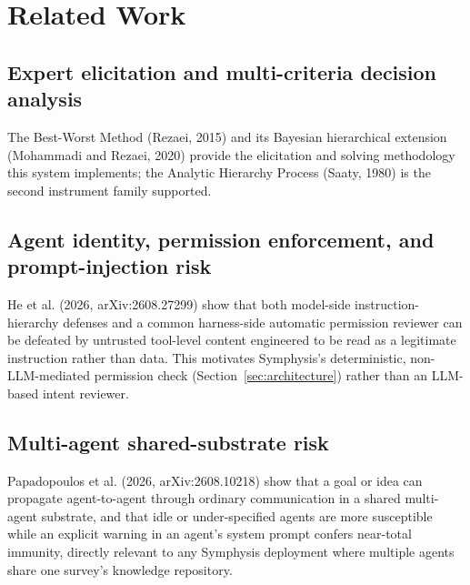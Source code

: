 \documentclass[11pt]{article}
\begin{document}
\section{Related Work}

\subsection{Expert elicitation and multi-criteria decision analysis}
The Best-Worst Method (Rezaei, 2015) and its Bayesian hierarchical
extension (Mohammadi and Rezaei, 2020) provide the elicitation and
solving methodology this system implements; the Analytic Hierarchy
Process (Saaty, 1980) is the second instrument family supported.

\subsection{Agent identity, permission enforcement, and prompt-injection risk}
He et al. (2026, arXiv:2608.27299) show that both model-side
instruction-hierarchy defenses and a common harness-side automatic
permission reviewer can be defeated by untrusted tool-level content
engineered to be read as a legitimate instruction rather than data. This
motivates Symphysis's deterministic, non-LLM-mediated permission check
(Section~\ref{sec:architecture}) rather than an LLM-based intent reviewer.

\subsection{Multi-agent shared-substrate risk}
Papadopoulos et al. (2026, arXiv:2608.10218) show that a goal or idea can
propagate agent-to-agent through ordinary communication in a shared
multi-agent substrate, and that idle or under-specified agents are more
susceptible while an explicit warning in an agent's system prompt confers
near-total immunity, directly relevant to any Symphysis deployment where
multiple agents share one survey's knowledge repository.
\end{document}
